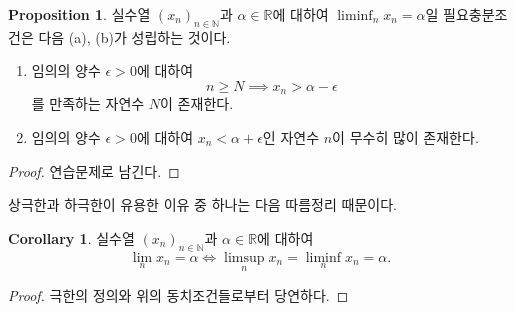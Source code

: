 \documentclass[11pt]{book}
\numberwithin{equation}{chapter}
\def\NN{\mathbb{N}}
\def\RR{\mathbb{R}}
\def\eps{\epsilon}
\theoremstyle{definition}
\newtheorem{cor}[thm]{Corollary}
\newtheorem{prop}[thm]{Proposition}
\begin{document}
    \begin{prop}
        실수열 \((x_n)_{n \in \NN}\)과 \(\alpha \in \RR\)에 대하여 \(\liminf_{n} x_n = \alpha\)일 필요충분조건은 다음 (a), (b)가 성립하는 것이다.
        \begin{enumerate} [label=(\alph*), leftmargin=2\parindent]
            \item 임의의 양수 \(\eps > 0\)에 대하여
            \[
            n \ge N \implies x_n > \alpha - \eps    
            \]
            를 만족하는 자연수 \(N\)이 존재한다.
            \item 임의의 양수 \(\eps > 0\)에 대하여 \(x_n < \alpha + \eps\)인 자연수 \(n\)이 무수히 많이 존재한다.
        \end{enumerate}
    \end{prop}
    \begin{proof}
        연습문제로 남긴다.
    \end{proof}

상극한과 하극한이 유용한 이유 중 하나는 다음 따름정리 때문이다.

    \begin{cor} \label{2.4.8}
        실수열 \((x_n)_{n \in \NN}\)과 \(\alpha \in \RR\)에 대하여
        \[
        \lim_n x_n = \alpha \iff \limsup_n x_n = \liminf_n x_n = \alpha.    
        \]
    \end{cor}
    \begin{proof}
        극한의 정의와 위의 동치조건들로부터 당연하다.
    \end{proof}
\end{document}
